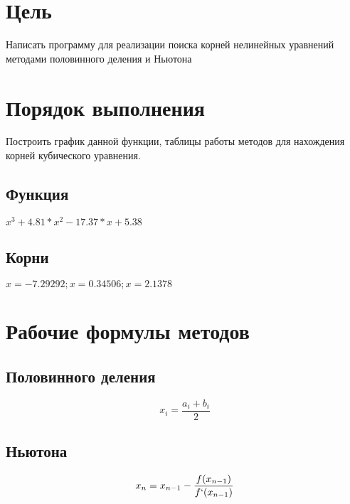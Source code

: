 \documentclass[12pt, a4paper]{article}
\begin{document}


\section*{Цель}
Написать программу для реализации поиска корней нелинейных уравнений методами половинного деления и Ньютона

\section*{Порядок выполнения}
Построить график данной функции, таблицы работы методов для нахождения корней кубического уравнения. 
\subsection*{Функция} 
$x^3 + 4.81 * x^2 - 17.37 * x + 5.38$
\subsection*{Корни}
$x = -7.29292; x = 0.34506; x = 2.1378$

\section*{Рабочие формулы методов}
\subsection*{Половинного деления}
$$ x_i = \frac{a_i + b_i}{2} $$
\subsection*{Ньютона}
$$ x_n = x_{n-1} - \frac{f(x_{n-1})}{f`(x_{n-1})} $$
\end{document}
